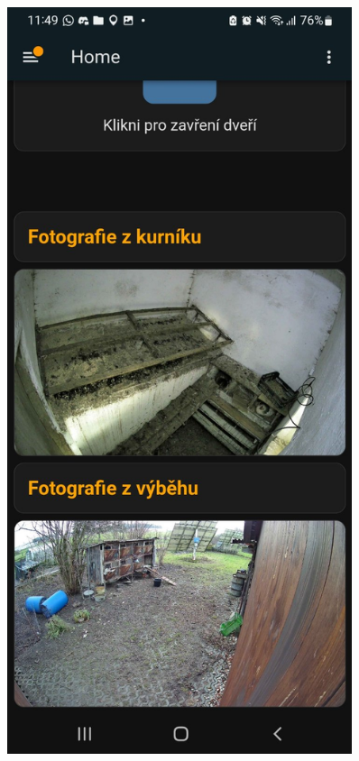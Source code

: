 \begin{figure}[H]
\begin{minipage}[t]{0.5\textwidth}
        \label{fig:mobilni_apka1}
    \end{minipage}%
    \begin{minipage}[t]{0.5\textwidth}
        \centering
        \includegraphics[width=0.9\textwidth]{img/mobilni_apka2}
        \label{fig:mobilni_apka2}
    \end{minipage}
\end{figure}

